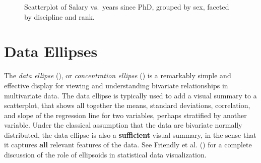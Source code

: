 \documentclass[
  letterpaper,
  10pt,
  krantz2]{krantz}
\begin{document}
\begin{figure}[H]


\caption{\label{fig-Salaries-facet-sex}Scatterplot of Salary vs.~years
since PhD, grouped by sex, faceted by discipline and rank.}

\end{figure}%

\section{Data Ellipses}\label{sec-data-ellipse}

The \emph{data ellipse} (), or
\emph{concentration ellipse} () is a remarkably simple and effective display for viewing and
understanding bivariate relationships in multivariate data. The data
ellipse is typically used to add a visual summary to a scatterplot, that
shows all together the means, standard deviations, correlation, and
slope of the regression line for two variables, perhaps stratified by
another variable. Under the classical assumption that the data are
bivariate normally distributed, the data ellipse is also a
\textbf{sufficient} visual summary, in the sense that it captures
\textbf{all} relevant features of the data. See Friendly et al.
() for a complete
discussion of the role of ellipsoids in statistical data visualization.
\end{document}
